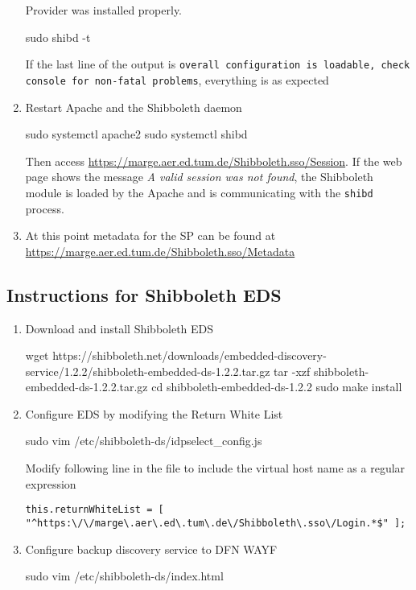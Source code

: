 \begin{enumerate}
    Provider was installed properly.
    \begin{terminal}
        sudo shibd -t
    \end{terminal}
    If the last line of the output is \texttt{overall configuration is loadable,
    check console for non-fatal problems}, everything is as expected
    \item Restart Apache and the Shibboleth daemon
    \begin{terminal}
	    sudo systemctl apache2 
        sudo systemctl shibd
    \end{terminal}
    Then access \url{https://marge.aer.ed.tum.de/Shibboleth.sso/Session}. If the
    web page shows the message \textit{A valid session was not found}, the
    Shibboleth module is loaded by the Apache and is communicating with the
    \texttt{shibd} process.
    \item At this point metadata for the SP can be found at
    \url{https://marge.aer.ed.tum.de/Shibboleth.sso/Metadata}
\end{enumerate}

\subsection{Instructions for Shibboleth EDS}

\begin{enumerate}
    \item Download and install Shibboleth EDS
    \begin{terminal}
        wget https://shibboleth.net/downloads/embedded-discovery-service/1.2.2/shibboleth-embedded-ds-1.2.2.tar.gz
        tar -xzf shibboleth-embedded-ds-1.2.2.tar.gz
        cd shibboleth-embedded-ds-1.2.2
        sudo make install
    \end{terminal}
    \item  Configure EDS by modifying the Return White List
    \begin{terminal}
        sudo vim /etc/shibboleth-ds/idpselect_config.js
    \end{terminal}
    Modify following line in the file to include the virtual host name as a
    regular expression
    \begin{lstlisting}[frame={l}]
        this.returnWhiteList = [ "^https:\/\/marge\.aer\.ed\.tum\.de\/Shibboleth\.sso\/Login.*$" ];
    \end{lstlisting}
    \item Configure backup discovery service to DFN WAYF
    \begin{terminal}
        sudo vim /etc/shibboleth-ds/index.html
    \end{terminal}
\end{enumerate}

